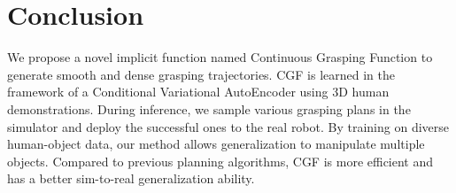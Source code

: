 \documentclass[letterpaper, 10 pt, journal, twoside]{IEEEtran}
\begin{document}
\vspace{-0.05in}
\section{Conclusion}
\label{sec:discussion}

We propose a novel implicit function named Continuous Grasping Function to generate smooth and dense grasping trajectories. CGF is learned in the framework of a Conditional Variational AutoEncoder using 3D human demonstrations. During inference, we sample various grasping plans in the simulator and deploy the successful ones to the real robot. By training on diverse human-object data, our method allows generalization to manipulate multiple objects. Compared to previous planning algorithms, CGF is more efficient and has a better sim-to-real generalization ability.

{\small
    
    
}
\end{document}
